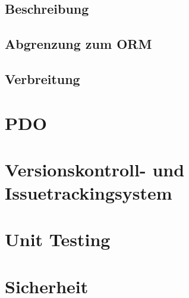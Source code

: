 	\subsection{Beschreibung}
	\subsection{Abgrenzung zum ORM}
	\subsection{Verbreitung}
\section{PDO}
\section{Versionskontroll- und Issuetrackingsystem}

\section{Unit Testing}

\section{Sicherheit}
